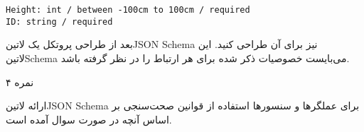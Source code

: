 \begin{latin}
\begin{verbatim}
Height: int / between -100cm to 100cm / required
ID: string / required
\end{verbatim}
\end{latin}

بعد از طراحی پروتکل یک ‌لاتین{JSON Schema} نیز برای آن طراحی کنید.
این ‌لاتین{Schema} می‌بایست خصوصیات ذکر شده برای هر ارتباط را در نظر گرفته باشد.


۴ نمره

\begin{پاسخ}

 ارائه ‌لاتین{JSON Schema} برای عملگرها و سنسورها
 استفاده از قوانین صحت‌سنجی بر اساس آنچه در صورت سوال آمده است.

\end{پاسخ}
